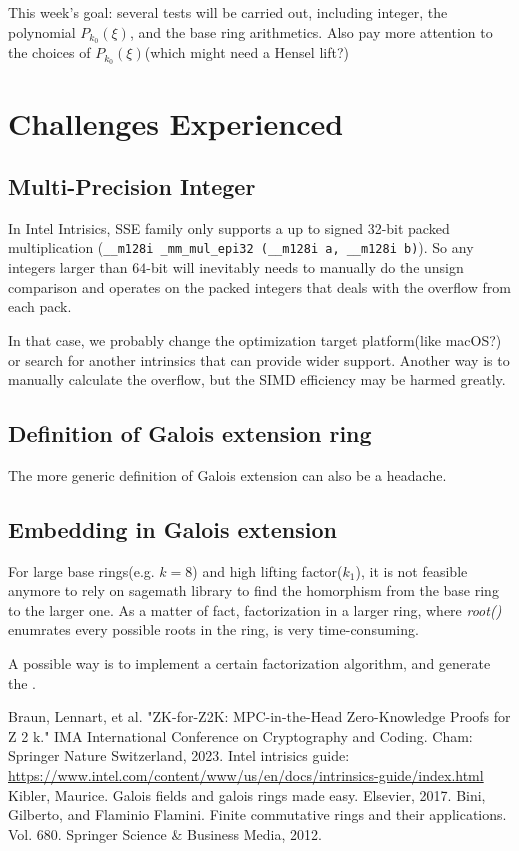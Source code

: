 \documentclass{article}
\begin{document}
This week's goal: several tests will be carried out, including integer, the polynomial $P_{k_0}(\xi)$, and the base ring arithmetics. Also pay more attention to the choices of $P_{k_0}(\xi)$(which might need a Hensel lift?)

\section{Challenges Experienced}

\subsection{Multi-Precision Integer}

In Intel Intrisics, SSE family only supports a up to signed 32-bit packed multiplication (\texttt{\_\_m128i \_mm\_mul\_epi32 (\_\_m128i a, \_\_m128i b)}). So any integers larger than $64$-bit will inevitably needs to manually do the unsign comparison and operates on the packed integers that deals with the overflow from each pack.

In that case, we probably change the optimization target platform(like macOS?) or search for another intrinsics that can provide wider support. Another way is to manually calculate the overflow, but the SIMD efficiency may be harmed greatly.


\subsection{Definition of Galois extension ring}

The more generic definition of Galois extension can also be a headache.


\subsection{Embedding in Galois extension}

For large base rings(e.g. $k =8$) and high lifting factor($k_1$), it is not feasible anymore to rely on sagemath library to find the homorphism from the base ring to the larger one. As a matter of fact, factorization in a larger ring, where \textit{root()} enumrates every possible roots in the ring, is very time-consuming.

A possible way is to implement a certain factorization algorithm, and generate the .



\begin{thebibliography}{99}
 Braun, Lennart, et al. "ZK-for-Z2K: MPC-in-the-Head Zero-Knowledge Proofs for Z 2 k." IMA International Conference on Cryptography and Coding. Cham: Springer Nature Switzerland, 2023.
 Intel intrisics guide: \url{https://www.intel.com/content/www/us/en/docs/intrinsics-guide/index.html}
 Kibler, Maurice. Galois fields and galois rings made easy. Elsevier, 2017.
 Bini, Gilberto, and Flaminio Flamini. Finite commutative rings and their applications. Vol. 680. Springer Science & Business Media, 2012.

\end{thebibliography}
%
\end{document}
